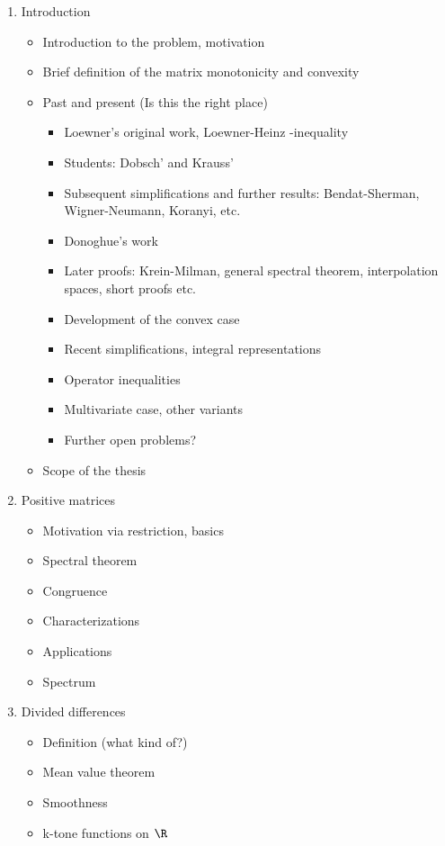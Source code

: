 \begin{enumerate}
	\item Introduction
		\begin{itemize}
			\item Introduction to the problem, motivation
			\item Brief definition of the matrix monotonicity and convexity
			\item Past and present (Is this the right place)
				\begin{itemize}
					\item Loewner's original work, Loewner-Heinz -inequality
					\item Students: Dobsch' and Krauss'
					\item Subsequent simplifications and further results: Bendat-Sherman, Wigner-Neumann, Koranyi, etc.
					\item Donoghue's work
					\item Later proofs: Krein-Milman, general spectral theorem, interpolation spaces, short proofs etc.
					\item Development of the convex case
					\item Recent simplifications, integral representations
					\item Operator inequalities
					\item Multivariate case, other variants
					\item Further open problems?
				\end{itemize}
			\item Scope of the thesis
		\end{itemize}
	\item Positive matrices
		\begin{itemize}
			\item Motivation via restriction, basics
			\item Spectral theorem
			\item Congruence
			\item Characterizations
			\item Applications
			\item Spectrum
		\end{itemize}
	\item Divided differences
		\begin{itemize}
			\item Definition (what kind of?)
			\item Mean value theorem
			\item Smoothness
			\item k-tone functions on $\R$

\end{itemize}
\end{enumerate}
